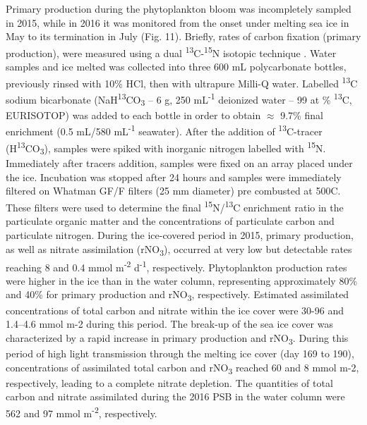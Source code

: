 \documentclass[essd, manuscript]{copernicus}
\begin{document}
Primary production during the phytoplankton bloom was incompletely sampled in 2015, while in 2016 it was monitored from the onset under melting sea ice in May to its termination in July (Fig. 11). Briefly, rates of carbon fixation (primary production), were measured using a dual \textsuperscript{13}C-\textsuperscript{15}N isotopic technique \citep{Raimbault1999}. Water samples and ice melted was collected into three 600 mL polycarbonate bottles, previously rinsed with 10\% HCl, then with ultrapure Milli-Q water. Labelled \textsuperscript{13}C sodium bicarbonate (NaH\textsuperscript{13}CO\textsubscript{3} – 6 g, 250 mL\textsuperscript{-1} deionized water – 99 at \% \textsuperscript{13}C, EURISOTOP) was added to each bottle in order to obtain $\approx$ 9.7\% final enrichment (0.5 mL/580 mL\textsuperscript{-1} seawater). After the addition of \textsuperscript{13}C-tracer (H\textsuperscript{13}CO\textsubscript{3}), samples were spiked with inorganic nitrogen labelled with \textsuperscript{15}N. Immediately after tracers addition, samples were fixed on an array placed under the ice. Incubation was stopped after 24 hours and samples were immediately filtered on Whatman GF/F filters (25 mm diameter) pre combusted at 500\textdegree{}C. These filters were used to determine the final \textsuperscript{15}N/\textsuperscript{13}C enrichment ratio in the particulate organic matter and the concentrations of particulate carbon and particulate nitrogen. During the ice-covered period in 2015, primary production, as well as nitrate assimilation (rNO\textsubscript{3}), occurred at very low but detectable rates reaching 8 and 0.4 mmol m\textsuperscript{-2} d\textsuperscript{-1}, respectively. Phytoplankton production rates were higher in the ice than in the water column, representing approximately 80\% and 40\% for primary production and rNO\textsubscript{3}, respectively. Estimated assimilated concentrations of total carbon and nitrate within the ice cover were 30-96 and 1.4–4.6 mmol m-2 during this period.  The break-up of the sea ice cover was characterized by a rapid increase in primary production and rNO\textsubscript{3}. During this period of high light transmission through the melting ice cover (day 169 to 190), concentrations of assimilated total carbon and rNO\textsubscript{3} reached 60 and 8 mmol m-2, respectively, leading to a complete nitrate depletion. The quantities of total carbon and nitrate assimilated during the 2016 PSB in the water column were 562 and 97 mmol m\textsuperscript{-2}, respectively.
\end{document}
